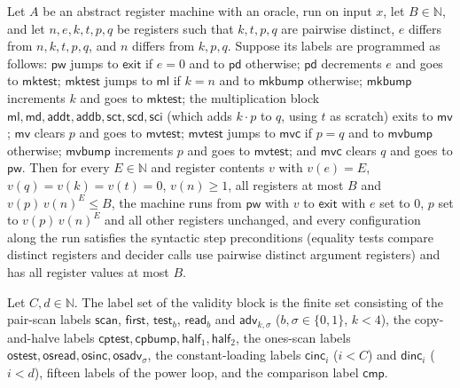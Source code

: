 \begin{theorem}
\label{Complexity.LogProg.epad_pow_loop}
\leanok
{}
Let $A$ be an abstract register machine with an oracle, run on input $x$, let $B \in \mathbb{N}$,
and let $n, e, k, t, p, q$ be registers such that $k, t, p, q$ are pairwise distinct, $e$ differs
from $n, k, t, p, q$, and $n$ differs from $k, p, q$. Suppose its labels are programmed as follows:
$\mathsf{pw}$ jumps to $\mathsf{exit}$ if $e = 0$ and to $\mathsf{pd}$ otherwise; $\mathsf{pd}$
decrements $e$ and goes to $\mathsf{mktest}$; $\mathsf{mktest}$ jumps to $\mathsf{ml}$ if $k = n$
and to $\mathsf{mkbump}$ otherwise; $\mathsf{mkbump}$ increments $k$ and goes to $\mathsf{mktest}$;
the multiplication block $\mathsf{ml}, \mathsf{md}, \mathsf{addt}, \mathsf{addb}, \mathsf{sct},
\mathsf{scd}, \mathsf{sci}$ (which adds $k \cdot p$ to $q$, using $t$ as scratch) exits to
$\mathsf{mv}$; $\mathsf{mv}$ clears $p$ and goes to $\mathsf{mvtest}$; $\mathsf{mvtest}$ jumps to
$\mathsf{mvc}$ if $p = q$ and to $\mathsf{mvbump}$ otherwise; $\mathsf{mvbump}$ increments $p$ and
goes to $\mathsf{mvtest}$; and $\mathsf{mvc}$ clears $q$ and goes to $\mathsf{pw}$. Then for every
$E \in \mathbb{N}$ and register contents $v$ with $v(e) = E$, $v(q) = v(k) = v(t) = 0$,
$v(n) \ge 1$, all registers at most $B$ and $v(p)\,v(n)^E \le B$, the machine runs from
$\mathsf{pw}$ with $v$ to $\mathsf{exit}$ with $e$ set to $0$, $p$ set to $v(p)\,v(n)^E$ and all
other registers unchanged, and every configuration along the run satisfies the syntactic step preconditions (equality tests compare distinct registers and decider calls use pairwise distinct argument registers) and has all register values at most $B$.
\end{theorem}

\begin{definition}
\label{Complexity.EPadVL}
\leanok
Let $C, d \in \mathbb{N}$. The label set of the validity block is the finite set consisting of the
pair-scan labels $\mathsf{scan}$, $\mathsf{first}$, $\mathsf{test}_b$, $\mathsf{read}_b$ and
$\mathsf{adv}_{k,\sigma}$ ($b, \sigma \in \{0,1\}$, $k < 4$), the copy-and-halve labels
$\mathsf{cptest}, \mathsf{cpbump}, \mathsf{half}_1, \mathsf{half}_2$, the ones-scan labels
$\mathsf{ostest}, \mathsf{osread}, \mathsf{osinc}, \mathsf{osadv}_\sigma$, the constant-loading
labels $\mathsf{cinc}_i$ ($i < C$) and $\mathsf{dinc}_i$ ($i < d$), fifteen labels of the power
loop, and the comparison label $\mathsf{cmp}$.
\end{definition}

